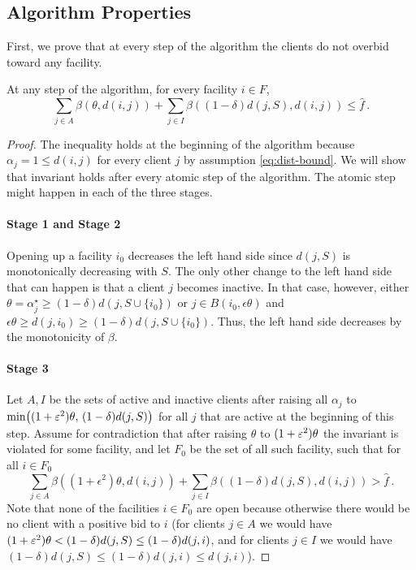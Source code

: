 \subsection{Algorithm Properties}
First, we prove that at every step of the algorithm the clients do not overbid toward any facility.
\begin{lemma}[No overbidding]
    \label{lem:overbidding}
    At any step of the algorithm, for every facility $i \in F$, 
    \[
        \sum_{j \in A} \beta(\theta, d(i,j)) + \sum_{j \in I} \beta((1-\delta)d(j, S), d(i,j)) \leq \hat f\,.
    \]
\end{lemma}
\begin{proof}
The inequality holds at the beginning of the algorithm because $\alpha_j = 1 \le d(i,j)$ for every client $j$ by assumption \eqref{eq:dist-bound}.
We will show that invariant holds after every atomic step of the algorithm.
The atomic step might happen in each of the three stages.

\paragraph{Stage 1 and Stage 2}
Opening up a facility $i_0$ decreases the left hand side since $d(j,S)$ is monotonically decreasing with $S$.
The only other change to the left hand side that can happen is that a client $j$ becomes inactive.
In that case, however, either $\theta = \alpha_j^\star \ge (1-\delta)d(j,S\cup \{i_0\})$ or $j \in B(i_0,\epsilon \theta)$ and $\epsilon \theta \ge d(j,i_0) \ge  (1-\delta)d(j,S\cup \{i_0\})$.
Thus, the left hand side decreases by the monotonicity of $\beta$.

\paragraph{Stage 3}
Let $A, I$ be the sets of active and inactive clients after raising all $\alpha_j$ to $\min\bigl((1+\varepsilon^2)\theta,\,(1-\delta)d(j,S)\bigr)$ for all $j$ that are active at the beginning of this step.
Assume for contradiction that after raising $\theta$ to $(1+\varepsilon^2)\theta$ the invariant is violated for some facility, and let $F_0$ be the set of all such facility, such that for all $i \in F_0$
\[
    \sum_{j \in A} \beta((1+\epsilon^2)\theta, d(i,j)) + \sum_{j \in I} \beta((1-\delta)d(j, S), d(i,j)) > \hat f\,.
\]
Note that none of the facilities $i \in F_0$ are open because otherwise there would be no client with a positive bid to $i$ (for clients $j \in A$ we would have $(1+\varepsilon^2)\theta < (1-\delta)d(j,S) \leq (1-\delta)d(j, i)$, and for clients $j \in I$ we would have $(1-\delta)d(j,S) \leq (1-\delta)d(j,i) \leq d(j, i)$).


\end{proof}
